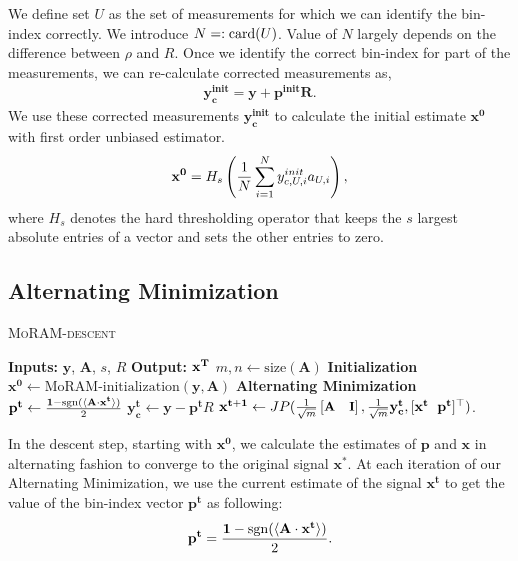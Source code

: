We define set $U$ as the set of measurements for which we can identify the bin-index correctly. We introduce $N=: \mathrm{card}(U)$.
Value of $N$ largely depends on the difference between $\rho$ and $R$.
Once we identify the correct bin-index for part of the measurements, we can re-calculate corrected measurements as,
\begin{align}
\mathbf{y^{init}_{c} = y + p^{init}R}.
\label{eq:y_init}
\end{align}
We use these corrected measurements $\mathbf{y^{init}_{c}}$ to calculate the initial estimate $\mathbf{{x}^0}$ with first order unbiased estimator.%
\begin{equation}
\mathbf{x^0} = H_s\left( \frac{1}{N}\sum_{i=1}^{N}y^{init}_{c,U,i}a_{U,i}\right),
\label{eq:init}
\end{equation}
where $H_s$ denotes the hard thresholding operator that keeps the $s$ largest absolute entries of a vector and sets the other entries to zero.
\subsection{Alternating Minimization}
\label{sec:altmin}
\begin{algorithm}[t]
	\caption{\textsc{MoRAM-descent}}
	\label{alg:MoRAM}
	\begin{algorithmic}
		\State\textbf{Inputs:} $\mathbf{y}$, $\mathbf{A}$, $s$, $R$
		\State\textbf{Output:}  $\mathbf{x^T}$
		\State $m,n \leftarrow \mathrm{size}(\mathbf{A})$ 
		\State \textbf{Initialization}
		\State $\mathbf{x^0} \leftarrow \textrm{MoRAM-initialization}(\mathbf{y, A})$ 
		\State \textbf{Alternating Minimization}
		\State $\mathbf{{p}^{t}} \leftarrow \frac{\mathbf{1}-\mathrm{sgn}(\langle \mathbf{A} \cdot \mathbf{x^t} \rangle)}{2}$
		\State $\mathbf{y^t_c} \leftarrow \mathbf{y} - \mathbf{p^t}R$
		\State $\mathbf{{x}^{t+1}}\leftarrow \small{JP(\frac{1}{\sqrt{m}}\begin{bmatrix} \mathbf{A} & \mathbf{I} \end{bmatrix},\frac{1}{\sqrt{m}}\mathbf{y^t_c},[\mathbf{x^t~~p^t}]^\top)}$.
		\EndFor
	\end{algorithmic}
\end{algorithm}

In the descent step, starting with $\mathbf{{x}^0}$, we calculate the estimates of $\mathbf{p}$ and $\mathbf{x}$ in alternating fashion to converge to the original signal $\mathbf{x^*}$. At each iteration of our Alternating Minimization, we use the current estimate of the signal ${\mathbf{x^t}}$ to get the value of the bin-index vector $\mathbf{{p}^t}$ as following:
\begin{equation}
\mathbf{{p}^{t}} = \frac{\mathbf{1}-\mathrm{sgn}(\langle \mathbf{A} \cdot \mathbf{x^t} \rangle)}{2}.
\label{step1}
\end{equation}


